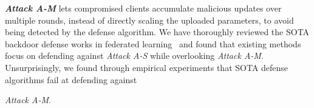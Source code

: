 \noindent\textbf{\textit{Attack A-M}} lets compromised clients accumulate malicious updates over multiple rounds, instead of directly scaling the uploaded parameters, to avoid being detected by the defense algorithm. 
We have thoroughly reviewed the SOTA backdoor defense works in federated learning~\cite{foolgold,krum,Trimmed_Mean,Bulyan,RFA,canyou} and found that existing methods focus on defending against \textit{Attack A-S} while overlooking \textit{Attack A-M}. Unsurprisingly, we found through empirical experiments that SOTA defense algorithms fail at defending against {\textit{Attack A-M}.

}
